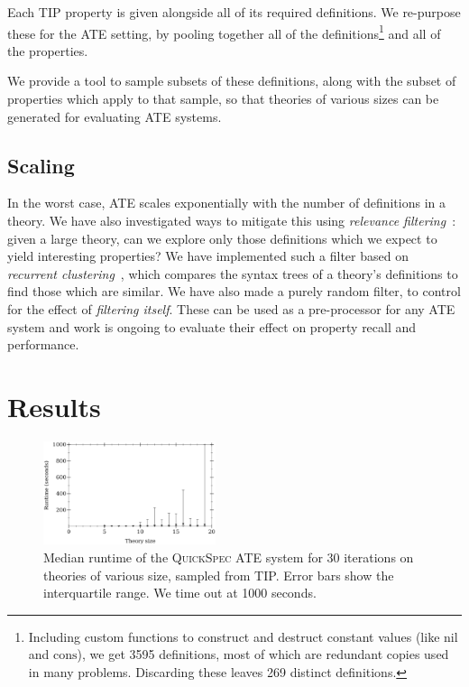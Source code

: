 \documentclass[]{default}
\newcommand{\name}[1]{\mathrm{#1}}
\begin{document}
Each TIP property is given alongside all of its required definitions. We
re-purpose these for the ATE setting, by pooling together all of
the definitions\footnote{Including custom functions to construct and destruct
  constant values (like $\name{nil}$ and $\name{cons}$), we get 3595
  definitions, most of which are redundant copies used in many problems.
  Discarding these leaves 269 distinct definitions.} and all of the properties.

We provide a tool to sample subsets of these definitions, along with the subset
of properties which apply to that sample, so that theories of various sizes can
be generated for evaluating ATE systems.

\subsection{Scaling}\label{recurrent-clustering}

In the worst case, ATE scales exponentially with the number of definitions in a
theory. We have also investigated ways to mitigate this using \emph{relevance
  filtering}~\cite{meng2009lightweight}: given a large theory, can we explore
only those definitions which we expect to yield interesting properties? We have
implemented such a filter based on
\emph{recurrent clustering}~\cite{journals/corr/abs-1212-3618}, which compares
the syntax trees of a theory's definitions to find those which are similar. We
have also made a purely random filter, to control for the effect of
\emph{filtering itself}. These can be used as a pre-processor for any ATE system
and work is ongoing to evaluate their effect on property recall and performance.

\section{Results}

\begin{figure}
  \centering
  \includegraphics[width=0.45\textwidth]{runtimes}
  \vspace{-3mm}
  \caption{Median runtime of the \textsc{QuickSpec} ATE system for 30 iterations
    on theories of various size, sampled from TIP. Error bars show the
    interquartile range. We time out at 1000 seconds.}\label{fig:runtimes}
  \vspace{-5mm}
\end{figure}
\end{document}
